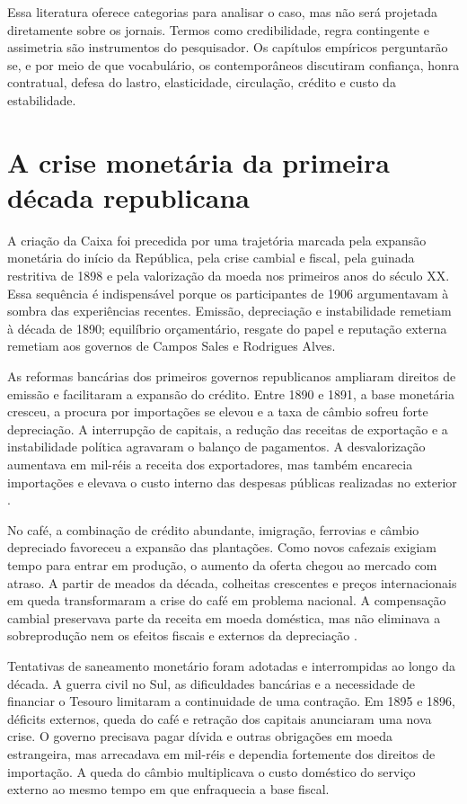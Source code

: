 Essa literatura oferece categorias para analisar o caso, mas não será projetada diretamente sobre os jornais. Termos como credibilidade, regra contingente e assimetria são instrumentos do pesquisador. Os capítulos empíricos perguntarão se, e por meio de que vocabulário, os contemporâneos discutiram confiança, honra contratual, defesa do lastro, elasticidade, circulação, crédito e custo da estabilidade.

\section{A crise monetária da primeira década republicana}

A criação da Caixa foi precedida por uma trajetória marcada pela expansão monetária do início da República, pela crise cambial e fiscal, pela guinada restritiva de 1898 e pela valorização da moeda nos primeiros anos do século XX. Essa sequência é indispensável porque os participantes de 1906 argumentavam à sombra das experiências recentes. Emissão, depreciação e instabilidade remetiam à década de 1890; equilíbrio orçamentário, resgate do papel e reputação externa remetiam aos governos de Campos Sales e Rodrigues Alves.

As reformas bancárias dos primeiros governos republicanos ampliaram direitos de emissão e facilitaram a expansão do crédito. Entre 1890 e 1891, a base monetária cresceu, a procura por importações se elevou e a taxa de câmbio sofreu forte depreciação. A interrupção de capitais, a redução das receitas de exportação e a instabilidade política agravaram o balanço de pagamentos. A desvalorização aumentava em mil-réis a receita dos exportadores, mas também encarecia importações e elevava o custo interno das despesas públicas realizadas no exterior \cite{fritsch1990,francolago2011}.

No café, a combinação de crédito abundante, imigração, ferrovias e câmbio depreciado favoreceu a expansão das plantações. Como novos cafezais exigiam tempo para entrar em produção, o aumento da oferta chegou ao mercado com atraso. A partir de meados da década, colheitas crescentes e preços internacionais em queda transformaram a crise do café em problema nacional. A compensação cambial preservava parte da receita em moeda doméstica, mas não eliminava a sobreprodução nem os efeitos fiscais e externos da depreciação \cite{saes1981,holloway1978}.

Tentativas de saneamento monetário foram adotadas e interrompidas ao longo da década. A guerra civil no Sul, as dificuldades bancárias e a necessidade de financiar o Tesouro limitaram a continuidade de uma contração. Em 1895 e 1896, déficits externos, queda do café e retração dos capitais anunciaram uma nova crise. O governo precisava pagar dívida e outras obrigações em moeda estrangeira, mas arrecadava em mil-réis e dependia fortemente dos direitos de importação. A queda do câmbio multiplicava o custo doméstico do serviço externo ao mesmo tempo em que enfraquecia a base fiscal.

